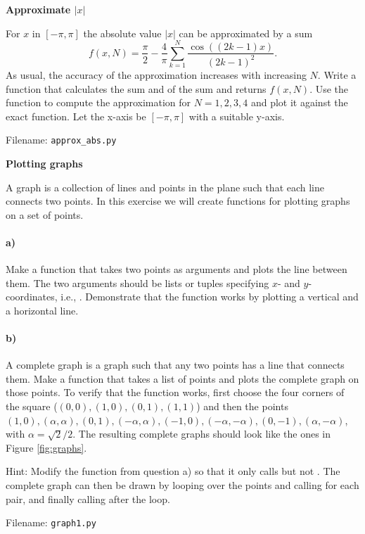 \begin{Problem}{\textbf{Approximate $|x|$}}

\noindent For $x$ in $[-\pi,\pi]$ the absolute value $|x|$ can be approximated by a sum
\begin{equation*}
	f(x,N)=\frac{\pi}{2}-\frac{4}{\pi} \sum_{k=1}^N \frac{\cos((2k-1)x)}{(2k-1)^2}.
\end{equation*}
As usual, the accuracy of the approximation increases with increasing $N$.
Write a function  that calculates the sum and
of the sum and returns $f(x,N)$. Use the function to compute the approximation
for $N=1,2,3,4$ and plot it against the exact function. Let the x-axis
be $[-\pi,\pi]$ with a suitable y-axis.

Filename: \texttt{approx\_abs.py}
\end{Problem}

\begin{Problem}{\textbf{Plotting graphs}}

\noindent A graph is a collection of lines and points in the plane
such that each line connects two points. In this exercise we will create functions for
plotting graphs on a set of points.

\paragraph{a)}
Make a function  that takes two points as arguments
and plots the line between them. The two arguments should be lists or tuples specifying
$x$- and $y$-coordinates, i.e., . Demonstrate that the
function works by plotting a vertical and a horizontal line.

\paragraph{b)}
A complete graph is a graph such that any two points has a line that connects them. Make a
function  that takes a list of points and plots the
complete graph on those points. To verify that the
function works, first choose the four corners of the square ($(0,0),(1,0),(0,1),(1,1)$)
and then the points $(1,0), (\alpha,\alpha), (0,1), (-\alpha,\alpha),
(-1,0), (-\alpha,-\alpha),(0,-1), (\alpha,-\alpha)$, with $\alpha=\sqrt{2}/2$. The resulting
complete graphs should look like the ones in Figure \ref{fig:graphs}.

Hint: Modify the  function from question a) so that it only calls
 but not . The complete graph can then be drawn by
looping over the points and calling  for each pair, and finally calling
 after the loop.

Filename: \texttt{graph1.py}
\end{Problem}

